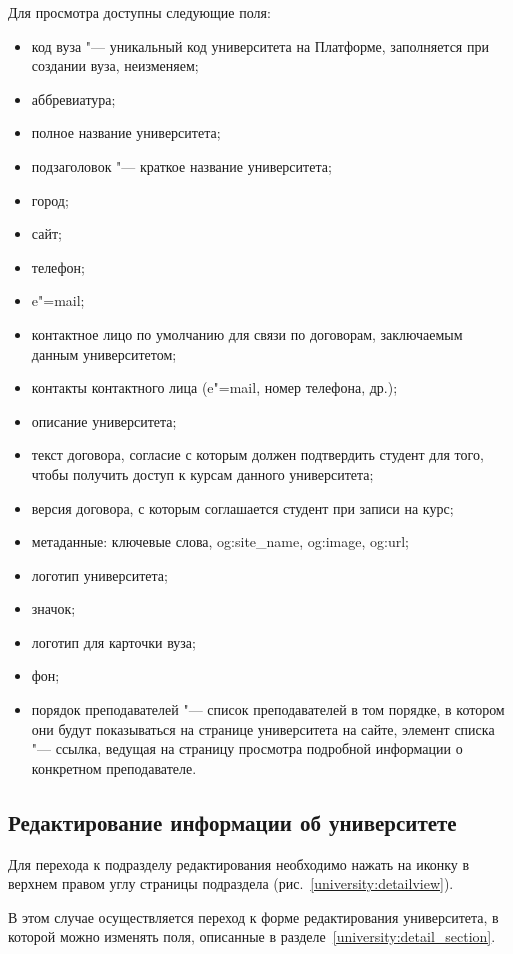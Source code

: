 	Для просмотра доступны следующие поля:
	\begin{itemize}
		\item код вуза "--- уникальный код университета на Платформе, заполняется при создании вуза, неизменяем;
		\item аббревиатура;
		\item полное название университета;
		\item подзаголовок "--- краткое название университета;
		\item город;
		\item сайт;
		\item телефон;
		\item e"=mail;
		\item контактное лицо по умолчанию для связи по договорам, заключаемым данным университетом;
		\item контакты контактного лица (e"=mail, номер телефона, др.);
		\item описание университета;
		\item текст договора, согласие с которым должен подтвердить студент для того, чтобы получить доступ к курсам данного университета;
		\item версия договора, с которым соглашается студент при записи на курс;
		\item метаданные: ключевые слова, og:site\_name, og:image, og:url;
		\item логотип университета;
		\item значок;
		\item логотип для карточки вуза;
		\item фон;
		\item порядок преподавателей "--- список преподавателей в том порядке, в котором они будут показываться на странице университета на сайте, элемент списка "--- ссылка, ведущая на страницу просмотра подробной информации о конкретном преподавателе.
	\end{itemize}

	\subsection{Редактирование информации об университете}\label{university:edit}
	Для перехода к подразделу редактирования необходимо нажать на иконку   в верхнем правом углу страницы подраздела  (рис.~\ref{university:detailview}).

	
	В этом случае осуществляется переход к форме редактирования университета, в которой можно изменять поля, описанные в разделе~\ref{university:detail_section}. 
	
